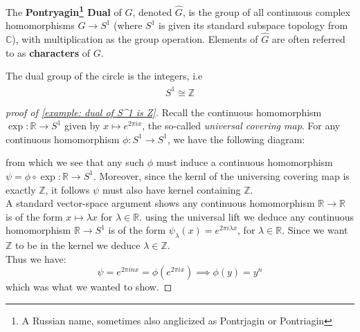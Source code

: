 \documentclass[11pt, x11names, openany]{book}
\newcommand{\zz}{\mathbb{Z}}
\newcommand{\rr}{\mathbb{R}}
\newcommand{\cc}{\mathbb{C}}
\renewcommand{\hat}{\widehat}
\begin{document}
\begin{defn}
    \label{def: Pontryagin Dual}
The \textbf{Pontryagin\footnote{A Russian name, sometimes also anglicized as Pontrjagin or Pontriagin} Dual} of $G$, denoted $\hat{G}$, is the group of all continuous
complex homomorphisms $G \to S^1$ (where $S^1$ is given its standard subspace topology
from $\cc$), with multiplication as the group operation. Elements of $\hat{G}$ are often
referred to as \textbf{characters} of $G$.
\end{defn}

\begin{example}
\label{example: dual of S^1 is Z}
    The dual group of the circle is the integers, i.e
    \begin{equation*}
        \hat{S^1} \cong \zz
    \end{equation*}
\end{example}

\begin{proof}[proof of \ref{example: dual of S^1 is Z}]
Recall the continuous homomorphism $\exp: \rr \to S^1$ given by $x \mapsto e^{2 \pi i x}$, the so-called \textit{universal covering map}. For any continuous homomorphism $\phi: S^1 \to S^1$, we have the following diagram:
\begin{center}
\end{center} 
from which we see that any such $\phi$ must induce a continuous homomorphism $\psi = \phi \circ \exp: \rr \to S^1$. Moreover, since the kernl of the universing covering map is exactly $\zz$, it follows $\psi$ must also have kernel containing $\zz$. \\
A standard vector-space argument shows any continuous homomorphism  $\rr \to \rr$ is of the form $x \mapsto \lambda x$ for $\lambda \in \rr$. using the universal lift we deduce any continuous homomorphism $\rr \to S^1$ is of the form $\psi_\lambda(x) = e^{2 \pi i \lambda x}$, for $\lambda \in \rr$. Since we want $\zz$ to be in the kernel we deduce $\lambda \in \zz$.\\
Thus we have:
\begin{equation*}
    \psi = e^{2 \pi i n x} = \phi (e^{2 \pi i x}) \implies \phi(y) = y^n
\end{equation*}
which was what we wanted to show.
\end{proof}
 
\end{document}

